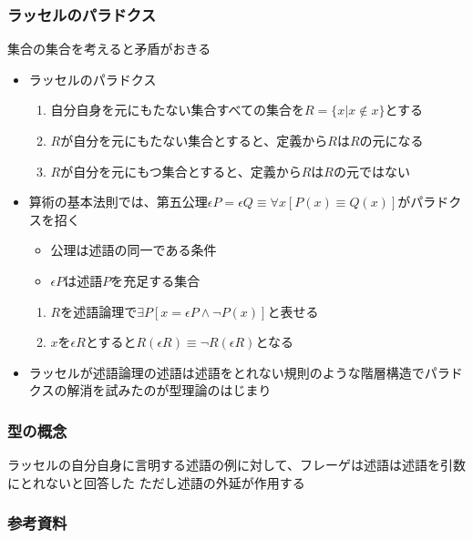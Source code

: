 \documentclass[unicode, 14pt, aspectratio=169]{beamer}
\begin{document}
\begin{frame}
  \frametitle{ラッセルのパラドクス}
  {\large 集合の集合を考えると矛盾がおきる}
  \begin{itemize}
  \item ラッセルのパラドクス
    \begin{enumerate}
    \item 自分自身を元にもたない集合すべての集合を$R=\{x|x\notin x \}$とする
    \item $R$が自分を元にもたない集合とすると、定義から$R$は$R$の元になる
    \item $R$が自分を元にもつ集合とすると、定義から$R$は$R$の元ではない
    \end{enumerate}
  \item 算術の基本法則では、第五公理$\epsilon P=\epsilon Q \equiv \forall x [P(x)\equiv Q(x)]$がパラドクスを招く
    \begin{itemize}
    \item 公理は述語の同一である条件
    \item $\epsilon P$は述語$P$を充足する集合
    \end{itemize}
      \begin{enumerate}
    \item $R$を述語論理で$\exists P[x=\epsilon P\wedge \neg P(x)]$と表せる
    \item $x$を$\epsilon R$とすると$R(\epsilon R)\equiv\neg R(\epsilon R)$となる
    \end{enumerate}
  \item ラッセルが述語論理の述語は述語をとれない規則のような階層構造でパラドクスの解消を試みたのが型理論のはじまり
  \end{itemize}
\end{frame}
\begin{frame}
  \frametitle{型の概念}
  ラッセルの自分自身に言明する述語の例に対して、フレーゲは述語は述語を引数にとれないと回答した
  ただし述語の外延が作用する
\end{frame}
\begin{frame}[allowframebreaks,t]
  \frametitle{参考資料}
  \printbibliography
  \nocite{*}
\end{frame}
\end{document}
